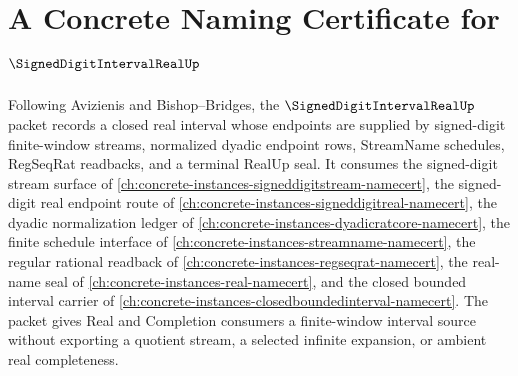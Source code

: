 \chapter{A Concrete Naming Certificate for $\SignedDigitIntervalRealUp$}
\label{ch:concrete-instances-signed-digit-interval-real-namecert}

Following Avizienis and Bishop--Bridges, the $\SignedDigitIntervalRealUp$ packet records a closed real interval whose endpoints are supplied by signed-digit finite-window streams, normalized dyadic endpoint rows, StreamName schedules, RegSeqRat readbacks, and a terminal RealUp seal. It consumes the signed-digit stream surface of \autoref{ch:concrete-instances-signeddigitstream-namecert}, the signed-digit real endpoint route of \autoref{ch:concrete-instances-signeddigitreal-namecert}, the dyadic normalization ledger of \autoref{ch:concrete-instances-dyadicratcore-namecert}, the finite schedule interface of \autoref{ch:concrete-instances-streamname-namecert}, the regular rational readback of \autoref{ch:concrete-instances-regseqrat-namecert}, the real-name seal of \autoref{ch:concrete-instances-real-namecert}, and the closed bounded interval carrier of \autoref{ch:concrete-instances-closedboundedinterval-namecert}. The packet gives Real and Completion consumers a finite-window interval source without exporting a quotient stream, a selected infinite expansion, or ambient real completeness.

